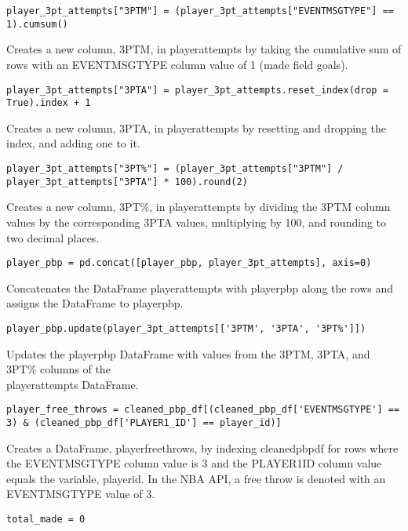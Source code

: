 \documentclass{article}
\begin{document}
\begin{lstlisting}
player_3pt_attempts["3PTM"] = (player_3pt_attempts["EVENTMSGTYPE"] == 1).cumsum()
\end{lstlisting}
Creates a new column, 3PTM, in player\textunderscore 3pt\textunderscore attempts by taking the cumulative sum of rows with an EVENTMSGTYPE column value of 1 (made field goals).
\begin{lstlisting}
player_3pt_attempts["3PTA"] = player_3pt_attempts.reset_index(drop = True).index + 1
\end{lstlisting}
Creates a new column, 3PTA, in player\textunderscore 3pt\textunderscore attempts by resetting and dropping the index, and adding one to it.
\begin{lstlisting}
player_3pt_attempts["3PT%"] = (player_3pt_attempts["3PTM"] / player_3pt_attempts["3PTA"] * 100).round(2)
\end{lstlisting}
Creates a new column, 3PT\%, in player\textunderscore 3pt\textunderscore attempts by dividing the 3PTM column values by the corresponding 3PTA values, multiplying by 100, and rounding to two decimal places.
\begin{lstlisting}
player_pbp = pd.concat([player_pbp, player_3pt_attempts], axis=0)
\end{lstlisting}
Concatenates the DataFrame player\textunderscore 3pt\textunderscore attempts with player\textunderscore pbp along the rows and assigns the DataFrame to player\textunderscore pbp.
\begin{lstlisting}
player_pbp.update(player_3pt_attempts[['3PTM', '3PTA', '3PT%']])
\end{lstlisting}
Updates the player\textunderscore pbp DataFrame with values from the 3PTM, 3PTA, and 3PT\% columns of the\\
player\textunderscore 3pt\textunderscore attempts DataFrame.
\begin{lstlisting}
player_free_throws = cleaned_pbp_df[(cleaned_pbp_df['EVENTMSGTYPE'] == 3) & (cleaned_pbp_df['PLAYER1_ID'] == player_id)]
\end{lstlisting}
Creates a DataFrame, player\textunderscore free\textunderscore throws, by indexing cleaned\textunderscore pbp\textunderscore df for rows where the EVENTMSGTYPE column value is 3 and the PLAYER1\textunderscore ID column value equals the variable, player\textunderscore id. In the NBA API, a free throw is denoted with an EVENTMSGTYPE value of 3.
\begin{lstlisting}
total_made = 0
\end{lstlisting}
\end{document}
